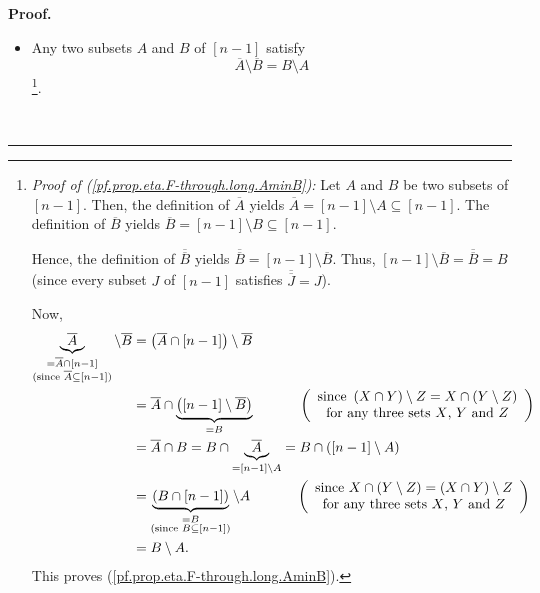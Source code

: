 \documentclass[numbers=enddot,12pt,final,onecolumn,notitlepage]{scrartcl}%
\theoremstyle{definition}
\newenvironment{proof}[1][Proof]{\noindent\textbf{#1.} }{\ \rule{0.5em}{0.5em}}
\newenvironment{verlong}{}{}
\begin{document}
\begin{verlong}
\begin{proof}
\begin{itemize}
\item Any two subsets $A$ and $B$ of $\left[  n-1\right]  $ satisfy
\begin{equation}
\overline{A}\setminus\overline{B}=B\setminus A
\label{pf.prop.eta.F-through.long.AminB}%
\end{equation}
\footnote{\textit{Proof of (\ref{pf.prop.eta.F-through.long.AminB}):} Let $A$
and $B$ be two subsets of $\left[  n-1\right]  $. Then, the definition of
$\overline{A}$ yields $\overline{A}=\left[  n-1\right]  \setminus
A\subseteq\left[  n-1\right]  $. The definition of $\overline{B}$ yields
$\overline{B}=\left[  n-1\right]  \setminus B\subseteq\left[  n-1\right]  $.
\par
Hence, the definition of $\overline{\overline{B}}$ yields $\overline
{\overline{B}}=\left[  n-1\right]  \setminus\overline{B}$. Thus, $\left[
n-1\right]  \setminus\overline{B}=\overline{\overline{B}}=B$ (since every
subset $J$ of $\left[  n-1\right]  $ satisfies $\overline{\overline{J}}=J$).
\par
Now,%
\begin{align*}
\underbrace{\overline{A}}_{\substack{=\overline{A}\cap\left[  n-1\right]
\\\text{(since }\overline{A}\subseteq\left[  n-1\right]  \text{)}}%
}\setminus\overline{B}  &  =\left(  \overline{A}\cap\left[  n-1\right]
\right)  \setminus\overline{B}\\
&  =\overline{A}\cap\underbrace{\left(  \left[  n-1\right]  \setminus
\overline{B}\right)  }_{=B}\ \ \ \ \ \ \ \ \ \ \left(
\begin{array}
[c]{c}%
\text{since }\left(  X\cap Y\right)  \setminus Z=X\cap\left(  Y\setminus
Z\right) \\
\text{for any three sets }X\text{, }Y\text{ and }Z
\end{array}
\right) \\
&  =\overline{A}\cap B=B\cap\underbrace{\overline{A}}_{=\left[  n-1\right]
\setminus A}=B\cap\left(  \left[  n-1\right]  \setminus A\right) \\
&  =\underbrace{\left(  B\cap\left[  n-1\right]  \right)  }%
_{\substack{=B\\\text{(since }B\subseteq\left[  n-1\right]  \text{)}%
}}\setminus A\ \ \ \ \ \ \ \ \ \ \left(
\begin{array}
[c]{c}%
\text{since }X\cap\left(  Y\setminus Z\right)  =\left(  X\cap Y\right)
\setminus Z\\
\text{for any three sets }X\text{, }Y\text{ and }Z
\end{array}
\right) \\
&  =B\setminus A.
\end{align*}
This proves (\ref{pf.prop.eta.F-through.long.AminB}).}.


\end{itemize}
\end{proof}
\end{verlong}
\end{document}

